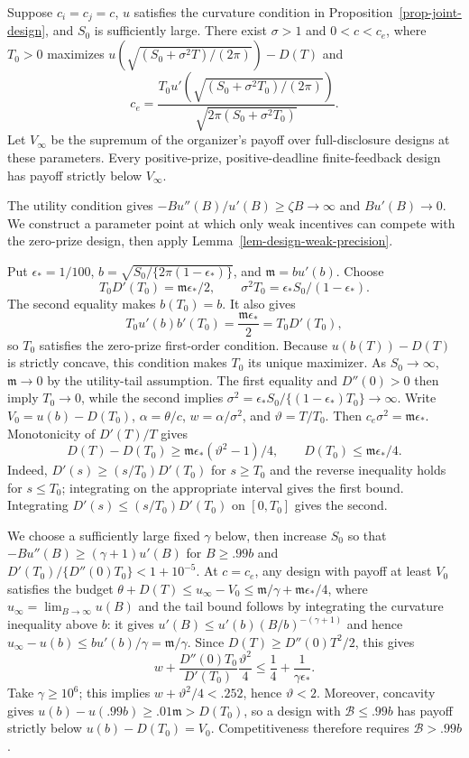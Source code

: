 \documentclass[mnsc]{informs3}
\begin{document}
\begin{APPENDICES}
{\begin{lemma}\label{lem-design-output-bound}
Suppose $c_i=c_j=c$, $u$ satisfies the curvature condition in
Proposition~\ref{prop-joint-design}, and $S_0$ is sufficiently large.
There exist $\sigma>1$ and $0<c<c_e$, where $T_0>0$ maximizes
$u(\sqrt{(S_0+\sigma^2T)/(2\pi)})-D(T)$ and
\[
c_e=\frac{T_0u'(\sqrt{(S_0+\sigma^2T_0)/(2\pi)})}
{\sqrt{2\pi(S_0+\sigma^2T_0)}}.
\]
Let $V_\infty$ be the supremum of the organizer's payoff over
full-disclosure designs at these parameters.
Every positive-prize, positive-deadline finite-feedback design has
payoff strictly below $V_\infty$.
\end{lemma}

The utility condition gives $-Bu''(B)/u'(B)\geq\zeta B\to\infty$
and $Bu'(B)\to0$.
We construct a parameter point at which only weak incentives can compete
with the zero-prize design, then apply Lemma~\ref{lem-design-weak-precision}.

Put ${\epsilon_*}=1/100$, $b=\sqrt{S_0/\{2\pi(1-{\epsilon_*})\}}$, and ${\mathfrak m}=bu'(b)$.
Choose
\[
T_0D'(T_0)={\mathfrak m}{\epsilon_*}/2,\qquad \sigma^2T_0={\epsilon_*}S_0/(1-{\epsilon_*}).
\]
The second equality makes $b(T_0)=b$. It also gives
\[
T_0u'(b)b'(T_0)=\frac{{\mathfrak m}{\epsilon_*}}{2}=T_0D'(T_0),
\]
so $T_0$ satisfies the zero-prize first-order condition. Because
$u(b(T))-D(T)$ is strictly concave, this condition makes $T_0$ its unique
maximizer. As $S_0\to\infty$, ${\mathfrak m}\to0$ by the utility-tail assumption.
The first equality and $D''(0)>0$ then imply $T_0\to0$, while the second
implies $\sigma^2={\epsilon_*}S_0/\{(1-{\epsilon_*})T_0\}\to\infty$.
Write $V_0=u(b)-D(T_0)$, $\alpha=\theta/c$,
$w=\alpha/\sigma^2$, and ${\vartheta}=T/T_0$. Then $c_e\sigma^2={\mathfrak m}{\epsilon_*}$.
Monotonicity of $D'(T)/T$ gives
\[
D(T)-D(T_0)\geq {\mathfrak m}{\epsilon_*}({\vartheta}^2-1)/4,\qquad D(T_0)\leq {\mathfrak m}{\epsilon_*}/4.
\]
Indeed, $D'(s)\geq(s/T_0)D'(T_0)$ for $s\geq T_0$ and the reverse
inequality holds for $s\leq T_0$; integrating on the appropriate interval
gives the first bound. Integrating
$D'(s)\leq(s/T_0)D'(T_0)$ on $[0,T_0]$ gives the second.

We choose a sufficiently large fixed $\gamma$ below, then increase $S_0$
so that $-Bu''(B)\geq(\gamma+1)u'(B)$ for $B\geq.99b$ and
$D'(T_0)/\{D''(0)T_0\}<1+10^{-5}$.
At $c=c_e$, any design with payoff at least $V_0$ satisfies
the budget $\theta+D(T)\leq u_\infty-V_0\leq {\mathfrak m}/\gamma+{\mathfrak m}{\epsilon_*}/4$,
where $u_\infty=\lim_{B\to\infty}u(B)$ and the tail bound follows
by integrating the curvature inequality above $b$: it gives
$u'(B)\leq u'(b)(B/b)^{-(\gamma+1)}$ and hence
$u_\infty-u(b)\leq bu'(b)/\gamma={\mathfrak m}/\gamma$. Since
$D(T)\geq D''(0)T^2/2$, this gives
\[
w+\frac{D''(0)T_0}{D'(T_0)}\frac{{\vartheta}^2}{4}
\leq\frac14+\frac1{\gamma {\epsilon_*}}.
\]
Take $\gamma\geq10^6$; this implies $w+{\vartheta}^2/4<.252$, hence ${\vartheta}<2$.
Moreover, concavity gives $u(b)-u(.99b)\geq.01{\mathfrak m}>D(T_0)$,
so a design with $\mathcal B\leq.99b$ has payoff strictly below
$u(b)-D(T_0)=V_0$. Competitiveness therefore requires
$\mathcal B>.99b$.

}
\end{APPENDICES}
\end{document}
